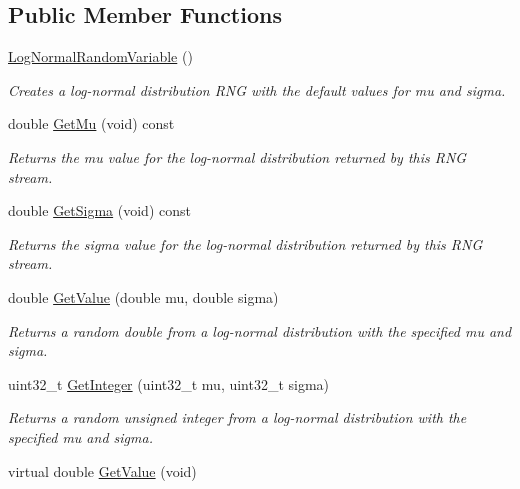 \subsection*{Public Member Functions}
\begin{DoxyCompactItemize}
\item 
\hyperlink{classns3_1_1LogNormalRandomVariable_a69738761a9533b9ac16ac76dadda7b86}{Log\+Normal\+Random\+Variable} ()
\begin{DoxyCompactList}\small\item\em Creates a log-\/normal distribution R\+NG with the default values for mu and sigma. \end{DoxyCompactList}\item 
double \hyperlink{classns3_1_1LogNormalRandomVariable_af0e5068584bc50f5efe643e3e37db751}{Get\+Mu} (void) const 
\begin{DoxyCompactList}\small\item\em Returns the mu value for the log-\/normal distribution returned by this R\+NG stream. \end{DoxyCompactList}\item 
double \hyperlink{classns3_1_1LogNormalRandomVariable_a3f7f5dfc6f4a922687857c109b382dea}{Get\+Sigma} (void) const 
\begin{DoxyCompactList}\small\item\em Returns the sigma value for the log-\/normal distribution returned by this R\+NG stream. \end{DoxyCompactList}\item 
double \hyperlink{classns3_1_1LogNormalRandomVariable_af37e3543a8416881d09bad093275d349}{Get\+Value} (double mu, double sigma)
\begin{DoxyCompactList}\small\item\em Returns a random double from a log-\/normal distribution with the specified mu and sigma. \end{DoxyCompactList}\item 
uint32\+\_\+t \hyperlink{classns3_1_1LogNormalRandomVariable_a13f6d7a6efe7faea646c5e0aa1b3d70e}{Get\+Integer} (uint32\+\_\+t mu, uint32\+\_\+t sigma)
\begin{DoxyCompactList}\small\item\em Returns a random unsigned integer from a log-\/normal distribution with the specified mu and sigma. \end{DoxyCompactList}\item 
virtual double \hyperlink{classns3_1_1LogNormalRandomVariable_a032ddb20a74ff98a35a76a2e43d12a0b}{Get\+Value} (void)

\end{DoxyCompactItemize}
